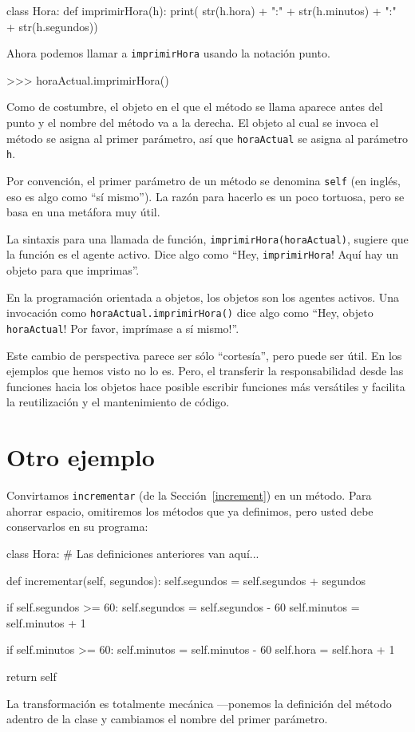 \begin{pythoncode}
class Hora:
  def imprimirHora(h):
    print( str(h.hora) + ":" + 
          str(h.minutos) + ":" + 
          str(h.segundos))
\end{pythoncode}
 Ahora podemos llamar a \texttt{imprimirHora} usando la notación punto.

\begin{pyconcode}
>>> horaActual.imprimirHora()
\end{pyconcode}

Como de costumbre, el objeto en el que el método se llama aparece
antes del punto y el nombre del método va a la derecha. El objeto
al cual se invoca el método se asigna al primer parámetro, así que
\texttt{horaActual} se asigna al parámetro \texttt{h}.

Por convención, el primer parámetro de un método se denomina \texttt{self}
(en inglés, eso es algo como ``sí mismo''). La razón para hacerlo
es un poco tortuosa, pero se basa en una metáfora muy útil.

La sintaxis para una llamada de función, \texttt{imprimirHora(horaActual)},
sugiere que la función es el agente activo. Dice algo como ``Hey,
\texttt{imprimirHora}! Aquí hay un objeto para que imprimas''.

En la programación orientada a objetos, los objetos son los agentes
activos. Una invocación como \texttt{horaActual.imprimirHora()} dice
algo como ``Hey, objeto \texttt{horaActual}! Por favor, imprímase
a sí mismo!''.

Este cambio de perspectiva parece ser sólo ``cortesía'', pero puede
ser útil. En los ejemplos que hemos visto no lo es. Pero, el transferir
la responsabilidad desde las funciones hacia los objetos hace posible
escribir funciones más versátiles y facilita la reutilización y el
mantenimiento de código.

\section{Otro ejemplo}

Convirtamos \texttt{incrementar} (de la Sección~\ref{increment})
en un método. Para ahorrar espacio, omitiremos los métodos que ya
definimos, pero usted debe conservarlos en su programa:

\pagebreak

\begin{pythoncode}
class Hora:
  # Las definiciones anteriores van aquí...
  
  def incrementar(self, segundos):
    self.segundos = self.segundos + segundos

    if self.segundos >= 60:
      self.segundos = self.segundos - 60
      self.minutos = self.minutos + 1

    if self.minutos >= 60:
      self.minutos = self.minutos - 60
      self.hora = self.hora + 1

    return self
\end{pythoncode}
 La transformación es totalmente mecánica —ponemos la definición del
método adentro de la clase y cambiamos el nombre del primer parámetro.

